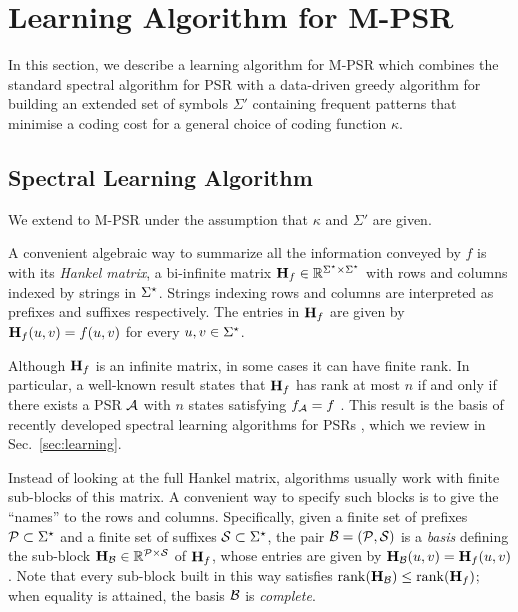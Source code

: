\section{Learning Algorithm for M-PSR}

In this section, we describe a learning algorithm for M-PSR which combines the standard spectral algorithm for PSR \cite{bootspsr} with a data-driven greedy algorithm for building an extended set of symbols $\Sigma'$ containing frequent patterns that minimise a coding cost for a general choice of coding function $\kappa$.

\subsection{Spectral Learning Algorithm}

We extend \cite{bootspsr} to M-PSR under the assumption that $\kappa$ and $\Sigma'$ are given.



A convenient algebraic way to summarize all the information conveyed by $f$ is
with its \emph{Hankel matrix}, a bi-infinite matrix $\mathbf{H}_f \in \mathbb{R}^{\Sigma^\star \times \Sigma^\star}$ with rows and
columns indexed by strings in $\Sigma^\star$.
%
Strings indexing rows and columns are interpreted as prefixes and suffixes respectively.
The entries in $\mathbf{H}_f$ are given by $\mathbf{H}_f(u,v) = f(u,v)$ for every $u, v
\in \Sigma^\star$.


Although $\mathbf{H}_f$ is an infinite matrix, in some cases it can have finite rank.
%
In particular, a well-known result states that $\mathbf{H}_f$ has rank at most $n$ if
and only if  there exists a PSR $\mathcal{A}$ with $n$ states satisfying
$f_{\mathcal{A}} = f$ \cite{CarlylePaz71,Fliess74}.
%
This result is the basis of recently developed spectral learning algorithms for
PSRs \cite{bootspsr}, which we review in Sec.~\ref{sec:learning}.

Instead of looking at the full Hankel matrix, algorithms usually work with finite
sub-blocks of this matrix.
%
A convenient way to specify such blocks is to give the ``names'' to the rows and
columns.
%
Specifically, given a finite set of prefixes $\mathcal{P} \subset \Sigma^\star$ and a finite
set of suffixes $\mathcal{S} \subset \Sigma^\star$, the pair $\mathcal{B} = (\mathcal{P},\mathcal{S})$ is
a \emph{basis} defining the sub-block $\mathbf{H}_{\mathcal{B}} \in \mathbb{R}^{\mathcal{P} \times \mathcal{S}}$ of
$\mathbf{H}_f$, whose entries are given by $\mathbf{H}_{\mathcal{B}}(u,v) = \mathbf{H}_f(u,v)$.
%
Note that every sub-block built in this way satisfies $\operatorname{rank}(\mathbf{H}_{\mathcal{B}}) \leq
\operatorname{rank}(\mathbf{H}_f)$; when equality is attained, the basis $\mathcal{B}$ is
\emph{complete}.


